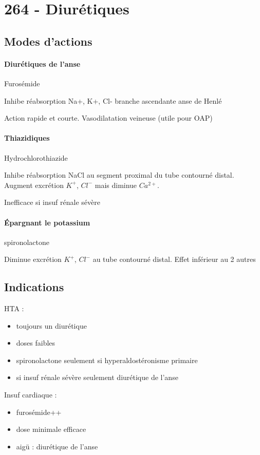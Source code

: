 \section{264 - Diurétiques}%
\label{sec:264_diuretiques}

\subsection{Modes d'actions}
\paragraph{Diurétiques de l'anse} Furosémide

Inhibe réabsorption Na+, K+, Cl- branche ascendante anse de Henlé

Action rapide et courte. Vasodilatation veineuse (utile pour OAP)

\paragraph{Thiazidiques} Hydrochlorothiazide

Inhibe réabsorption NaCl au segment proximal du tube contourné distal. Augment
excrétion $K^+$, $Cl^-$ mais diminue $Ca^{2+}$.

Inefficace si insuf rénale sévère

\paragraph{Épargnant le potassium} spironolactone

Diminue excrétion $K^+$, $Cl^-$ au tube contourné distal. Effet inférieur au 2
autres

\subsection{Indications}
HTA : 
\begin{itemize}
  \item toujours un diurétique
  \item doses faibles
  \item spironolactone seulement si hyperaldostéronisme primaire
  \item si insuf rénale sévère seulement diurétique de l'anse
\end{itemize}
Insuf cardiaque :
\begin{itemize}
  \item furosémide++
  \item dose minimale efficace
  \item aigü : diurétique de l'anse 
\end{itemize}

